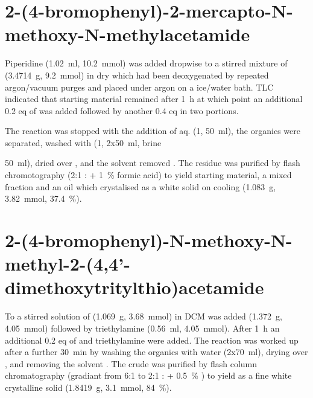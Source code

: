 \section{2-(4-bromophenyl)-2-mercapto-N-methoxy-N-methylacetamide}

Piperidine (\SI{1.02}{\milli\litre}, \SI{10.2}{\milli\mol}) was added dropwise to a stirred mixture of  (\SI{3.4714}{\gram}, \SI{9.2}{\milli\mol}) in dry  which had been deoxygenated by repeated argon/vacuum purges and placed under argon on a ice/water bath. TLC indicated that starting material remained after \SI{1}{\hour} at which point an additional 0.2 eq of  was added followed by another 0.4 eq in two portions.

The reaction was stopped with the addition of aq.  (\SI{1}{\Molar}, \SI{50}{\milli\litre}), the organics were separated, washed with  (\SI{1}{\Molar}, 2x\SI{50}{\milli\litre}, brine {\SI{50}{\milli\litre}), dried over , and the solvent removed \invacuo. The residue was purified by flash chromotography (2:1 : + \SI{1}{\percent} formic acid) to yield starting material, a mixed fraction and an oil which crystalised as a white solid  on cooling (\SI{1.083}{\gram}, \SI{3.82}{\milli\mol}, \SI{37.4}{\percent}).


\section{2-(4-bromophenyl)-N-methoxy-N-methyl-2-(4,4'-dimethoxytritylthio)acetamide}

To a stirred solution of  (\SI{1.069}{\gram}, \SI{3.68}{\milli\mol}) in DCM was added  (\SI{1.372}{\gram}, \SI{4.05}{\milli\mol}) followed by triethylamine (\SI{0.56}{\milli\litre}, \SI{4.05}{\milli\mol}). After \SI{1}{\hour} an additional 0.2 eq of  and triethylamine were added. The reaction was worked up after a further \SI{30}{\minute} by washing the organics with water (2x\SI{70}{\milli\litre}), drying over , and removing the solvent \invacuo. The crude was purified by flash column chromatography (gradiant from 6:1 to 2:1 : + \SI{0.5}{\percent} ) to yield  as a fine white crystalline solid (\SI{1.8419}{\gram}, \SI{3.1}{\milli\mol}, \SI{84}{\percent}).

}
